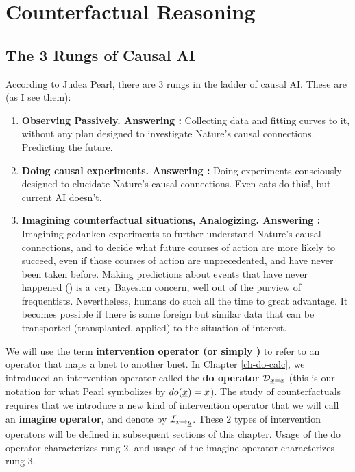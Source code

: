 \chapter{Counterfactual Reasoning}
\label{ch-counterf}


\section{The 3 Rungs of Causal AI}
According to
Judea Pearl,
there are 3 rungs in the
ladder of causal AI.
These are (as I see them):
\begin{enumerate}
\item
{\bf Observing Passively. Answering :} Collecting
data
and fitting curves to it,
without any plan
designed to
investigate Nature's
causal connections. Predicting the future.
\item {\bf Doing causal
experiments. Answering :}
Doing experiments
consciously designed to
elucidate
Nature's causal connections.
Even cats do this!, but current AI doesn't.
\item {\bf Imagining
 counterfactual situations, Analogizing. Answering :}
Imagining gedanken experiments
to further understand
Nature's causal connections,
and to decide what future
courses of action are
more likely to succeed,
even if
those courses of action
are unprecedented, and have never been taken before.
Making
predictions about
 events that have never happened ()
is a very Bayesian
concern, well out of the purview of
frequentists. Nevertheless,
humans do such
all the time to great advantage.
It becomes
possible if there
is some foreign but similar
data that can be transported
(transplanted, applied)
to the situation of
interest.


\end{enumerate}

We will use the
term {\bf intervention operator (or simply )}
to refer to an operator
that maps a bnet to another bnet.
In Chapter \ref{ch-do-calc},
we introduced an intervention operator
 called the {\bf do operator}
$\cald_{\rvx=x}$ (this is our notation for what Pearl
symbolizes by $do(\rvx)=x$).
The study of counterfactuals
requires that we
introduce a new
kind of intervention
operator that we will
call an {\bf imagine operator},
and denote by
$\cali_{\rvx\rarrow\rvy}$.
These 2 types of intervention
operators
will be defined
in subsequent sections of this chapter.
Usage of the do operator 
characterizes rung 2, and usage of 
the imagine operator characterizes
rung 3.

